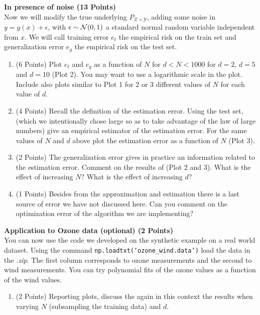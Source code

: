 \documentclass{article}
\begin{document}
\textbf{\color{nyupurple} In presence of noise (13 Points)}\\
Now we will modify the true underlying $P_{\mathcal{X} \times \mathcal{Y}}$, adding some noise in $y = g(x) + \epsilon$, with $\epsilon \sim {\mathcal{N}}(0,1)$ a standard normal random variable independent from $x$. We will call training error $e_t$ the empirical risk on the train set and generalization error $e_g$ the empirical risk on the test set.
\begin{enumerate}
\setcounter{enumi}{\value{saveenum}}
    \item (6 Points) Plot $e_t$ and $e_g$ as a function of $N$ for $d < N < 1000$ for $d = 2$, $d=5$ and $d=10$ (Plot 2). You may want to use a logarithmic scale in the plot. Include also plots similar to Plot 1 for 2 or 3 different values of $N$ for each value of $d$. 
    
    \item (4 Points) Recall the definition of the estimation error. Using the test set, (which we intentionally chose large so as to take advantage of the law of large numbers) give an empirical estimator of the estimation error. For the same values of $N$ and $d$ above plot the estimation error as a function of $N$ (Plot 3).
    
    \item (2 Points) The generalization error gives in practice an information related to the estimation error. Comment on the results of (Plot 2 and 3). What is the effect of increasing $N$? What is the effect of increasing $d$?
    
    \item (1 Points) Besides from the approximation and estimation there is a last source of error we have not discussed here. Can you comment on the optimization error of the algorithm we are implementing?
    
\setcounter{saveenum}{\value{enumi}}    
\end{enumerate}

\textbf{\color{nyupurple} Application to Ozone data (optional) (2 Points)}\\
You can now use the code we developed on the synthetic example on a real world dataset. Using the command \texttt{np.loadtxt(`ozone\_wind.data')} load the data in the \emph{.zip}. The first column corresponds to ozone measurements and the second to wind measurements. You can try polynomial fits of the ozone values as a function of the wind values. 

\begin{enumerate}
\setcounter{enumi}{\value{saveenum}}
    \item (2 Points) Reporting plots, discuss the again in this context the results when varying $N$ (subsampling the training data) and $d$. 
\end{enumerate}
\end{document}
